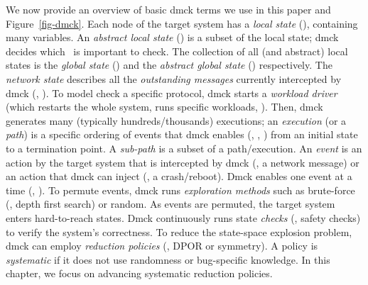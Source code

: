 We now provide an overview of basic dmck terms we use in this paper
and Figure~\ref{fig-dmck}.
%
Each node of the target system has a {\em local state} (\ls),
containing many variables.  An {\em abstract local state} (\als) is a
subset of the local state; dmck decides which \als\ is important to
check.
%
The collection of all (and abstract) local states is the {\em global
  state} (\gs) and the {\em abstract global state} (\ags)
respectively.  
%
The {\em network state} describes all the {\em outstanding messages}
currently intercepted by dmck (\eg, ).
%
To model check a specific protocol, dmck starts a {\em workload
  driver} (which restarts the whole system, runs specific workloads,
\etc).  Then, dmck generates many (typically hundreds/thousands)
executions; an {\em execution} (or a {\em path}) is a specific
ordering of events that dmck enables (\eg, , ) from
an initial state to a termination point.
%
A {\em sub-path} is a subset of a path/execution.
%
An {\em event} is an action by the target system that is intercepted
by dmck (\eg, a network message) or an action that dmck can inject
(\eg, a crash/reboot).
%
Dmck enables one event at a time (\eg, ).
%
To permute events, dmck runs {\em exploration methods} such as
brute-force (\eg, depth first search) or random.  
%
%
As events are permuted, the target system enters hard-to-reach
states.  Dmck continuously runs state {\em checks} (\eg, safety 
checks) to verify the system's correctness.
%
To reduce the state-space explosion problem, dmck can employ {\em
  reduction policies} (\eg, DPOR or symmetry).  A policy is {\em
  systematic} if it does not use randomness or bug-specific knowledge.
%
In this chapter, we focus on advancing systematic reduction policies.




